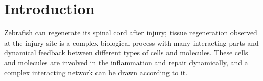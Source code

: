 \chapter{Introduction}







Zebrafish can regenerate its spinal cord after injury; tissue regeneration observed at the injury site is a complex biological process with many interacting parts and dynamical feedback between different types of cells and molecules. These cells and molecules are involved in the inflammation and repair dynamically, and a complex interacting network can be drawn according to it.





